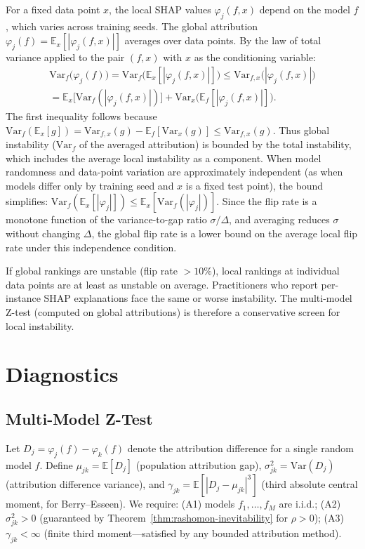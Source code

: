 \documentclass{jmlr}
\newcommand{\E}{\mathbb{E}}
\newcommand{\Var}{\mathrm{Var}}
\begin{document}
For a fixed data point $x$, the local SHAP values $\varphi_j(f, x)$ depend on the model $f$, which varies across training seeds. The global attribution $\varphi_j(f) = \E_x[|\varphi_j(f, x)|]$ averages over data points. By the law of total variance applied to the pair $(f, x)$ with $x$ as the conditioning variable:
\begin{multline*}
    \Var_f\!\big(\varphi_j(f)\big) = \Var_f\!\big(\E_x[|\varphi_j(f,x)|]\big) \leq \Var_{f,x}\!\big(|\varphi_j(f,x)|\big) \\
    = \E_x\!\big[\Var_f(|\varphi_j(f,x)|)\big] + \Var_x\!\big(\E_f[|\varphi_j(f,x)|]\big).
\end{multline*}
The first inequality follows because $\Var_f(\E_x[g]) = \Var_{f,x}(g) - \E_f[\Var_x(g)] \leq \Var_{f,x}(g)$.
Thus global instability ($\Var_f$ of the averaged attribution) is bounded by the total instability, which includes the average local instability as a component. When model randomness and data-point variation are approximately independent (as when models differ only by training seed and $x$ is a fixed test point), the bound simplifies: $\Var_f(\E_x[|\varphi_j|]) \leq \E_x[\Var_f(|\varphi_j|)]$.
Since the flip rate is a monotone function of the variance-to-gap ratio $\sigma/\Delta$, and averaging reduces $\sigma$ without changing $\Delta$, the global flip rate is a lower bound on the average local flip rate under this independence condition.

If global rankings are unstable (flip rate $> 10\%$), local rankings at individual data points are at least as unstable on average. Practitioners who report per-instance SHAP explanations face the same or worse instability. The multi-model Z-test (computed on global attributions) is therefore a conservative screen for local instability.


\section{Diagnostics}
\label{sec:diagnostics}

\subsection{Multi-Model Z-Test}
\label{sec:f1}

Let $D_j = \varphi_j(f) - \varphi_k(f)$ denote the attribution difference for a single random model $f$. Define $\mu_{jk} = \E[D_j]$ (population attribution gap), $\sigma_{jk}^2 = \Var(D_j)$ (attribution difference variance), and $\gamma_{jk} = \E[|D_j - \mu_{jk}|^3]$ (third absolute central moment, for Berry--Esseen). We require: (A1) models $f_1, \ldots, f_M$ are i.i.d.; (A2) $\sigma_{jk}^2 > 0$ (guaranteed by Theorem~\ref{thm:rashomon-inevitability} for $\rho > 0$); (A3) $\gamma_{jk} < \infty$ (finite third moment---satisfied by any bounded attribution method).
\end{document}
